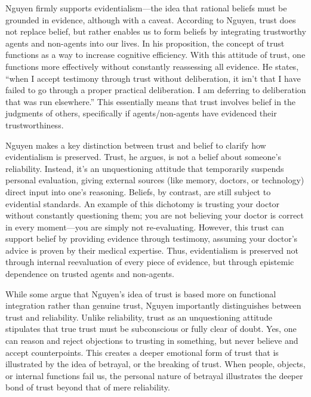 \documentclass[12pt, a4paper, twoside]{article}
\begin{document}
Nguyen firmly supports evidentialism—the idea that rational beliefs must be grounded in evidence, although with a caveat. According to Nguyen, trust does not replace belief, but rather enables us to form beliefs by integrating trustworthy agents and non-agents into our lives. In his proposition, the concept of trust functions as a way to increase cognitive efficiency. With this attitude of trust, one functions more effectively without constantly reassessing all evidence. He states, “when I accept testimony through trust without deliberation, it isn’t that I have failed to go through a proper practical deliberation. I am deferring to deliberation that was run elsewhere.” This essentially means that trust involves belief in the judgments of others, specifically if agents/non-agents have evidenced their trustworthiness.

Nguyen makes a key distinction between trust and belief to clarify how evidentialism is preserved. Trust, he argues, is not a belief about someone’s reliability. Instead, it’s an unquestioning attitude that temporarily suspends personal evaluation, giving external sources (like memory, doctors, or technology) direct input into one’s reasoning. Beliefs, by contrast, are still subject to evidential standards. An example of this dichotomy is trusting your doctor without constantly questioning them; you are not believing your doctor is correct in every moment—you are simply not re-evaluating. However, this trust can support belief by providing evidence through testimony, assuming your doctor’s advice is proven by their medical expertise. Thus, evidentialism is preserved not through internal reevaluation of every piece of evidence, but through epistemic dependence on trusted agents and non-agents.

While some argue that Nguyen’s idea of trust is based more on functional integration rather than genuine trust, Nguyen importantly distinguishes between trust and reliability. Unlike reliability, trust as an unquestioning attitude stipulates that true trust must be subconscious or fully clear of doubt. Yes, one can reason and reject objections to trusting in something, but never believe and accept counterpoints. This creates a deeper emotional form of trust that is illustrated by the idea of betrayal, or the breaking of trust. When people, objects, or internal functions fail us, the personal nature of betrayal illustrates the deeper bond of trust beyond that of mere reliability.
\end{document}
